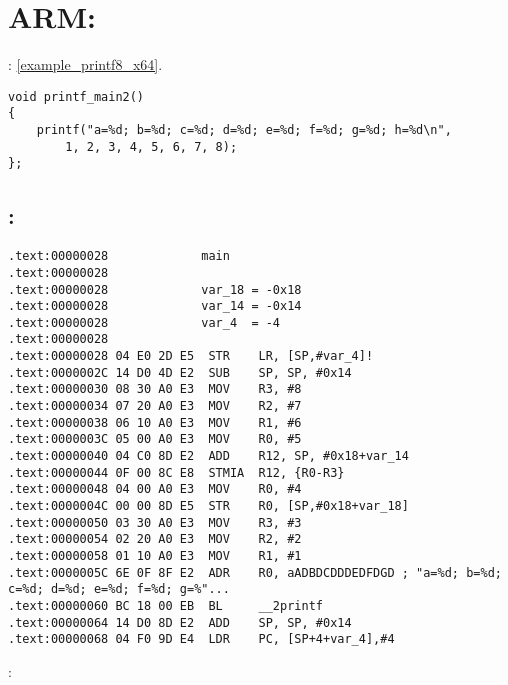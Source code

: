 \section{ARM: }

: \ref{example_printf8_x64}.

\begin{lstlisting}
void printf_main2()
{
    printf("a=%d; b=%d; c=%d; d=%d; e=%d; f=%d; g=%d; h=%d\n", 
        1, 2, 3, 4, 5, 6, 7, 8);
};
\end{lstlisting}

\subsection{\OptimizingKeilVI: \ARMMode}

\begin{lstlisting}
.text:00000028             main
.text:00000028
.text:00000028             var_18 = -0x18
.text:00000028             var_14 = -0x14
.text:00000028             var_4  = -4
.text:00000028
.text:00000028 04 E0 2D E5  STR    LR, [SP,#var_4]!
.text:0000002C 14 D0 4D E2  SUB    SP, SP, #0x14
.text:00000030 08 30 A0 E3  MOV    R3, #8
.text:00000034 07 20 A0 E3  MOV    R2, #7
.text:00000038 06 10 A0 E3  MOV    R1, #6
.text:0000003C 05 00 A0 E3  MOV    R0, #5
.text:00000040 04 C0 8D E2  ADD    R12, SP, #0x18+var_14
.text:00000044 0F 00 8C E8  STMIA  R12, {R0-R3}
.text:00000048 04 00 A0 E3  MOV    R0, #4
.text:0000004C 00 00 8D E5  STR    R0, [SP,#0x18+var_18]
.text:00000050 03 30 A0 E3  MOV    R3, #3
.text:00000054 02 20 A0 E3  MOV    R2, #2
.text:00000058 01 10 A0 E3  MOV    R1, #1
.text:0000005C 6E 0F 8F E2  ADR    R0, aADBDCDDDEDFDGD ; "a=%d; b=%d; c=%d; d=%d; e=%d; f=%d; g=%"...
.text:00000060 BC 18 00 EB  BL     __2printf
.text:00000064 14 D0 8D E2  ADD    SP, SP, #0x14
.text:00000068 04 F0 9D E4  LDR    PC, [SP+4+var_4],#4
\end{lstlisting}

:

